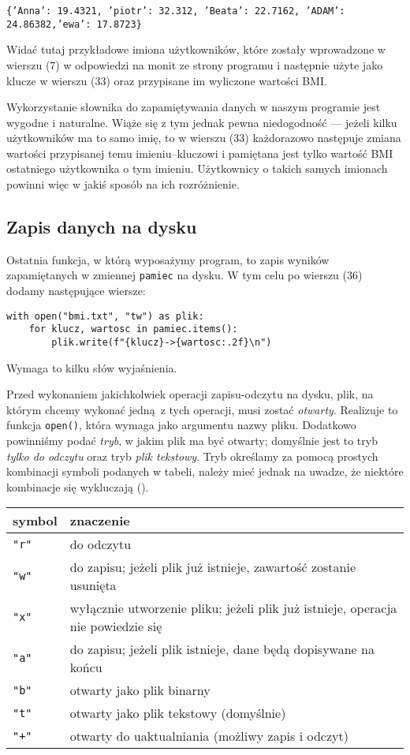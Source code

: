 \documentclass[a4paper]{article}
\begin{document}
\texttt{\{'Anna': 19.4321, 'piotr': 32.312, 'Beata': 22.7162, 'ADAM': 24.86382,\newline 'ewa': 17.8723\}}

Widać tutaj przykładowe imiona użytkowników, które zostały wprowadzone w wierszu (7) w odpowiedzi na monit ze strony programu i następnie użyte jako klucze w wierszu (33) oraz przypisane im wyliczone wartości BMI.

Wykorzystanie słownika do zapamiętywania danych w naszym programie jest wygodne i naturalne. Wiąże się z tym jednak pewna niedogodność --- jeżeli kilku użytkowników ma to samo imię, to w wierszu (33) każdorazowo następuje zmiana wartości przypisanej temu imieniu--kluczowi i pamiętana jest tylko wartość BMI ostatniego użytkownika o tym imieniu. Użytkownicy o takich samych imionach powinni więc w jakiś sposób na ich rozróżnienie.

\subsection{Zapis danych na dysku}

Ostatnia funkcja, w którą wyposażymy program, to zapis wyników zapamiętanych w zmiennej \texttt{pamiec} na dysku. W tym celu po wierszu (36) dodamy następujące wiersze:

\begin{lstlisting}[firstnumber=37]
with open("bmi.txt", "tw") as plik:
    for klucz, wartosc in pamiec.items():
        plik.write(f"{klucz}->{wartosc:.2f}\n")
\end{lstlisting}

Wymaga to kilku słów wyjaśnienia.

Przed wykonaniem jakichkolwiek operacji zapisu-odczytu na dysku, plik, na którym chcemy wykonać jedną z tych operacji, musi zostać \emph{otwarty}. Realizuje to funkcja \texttt{open()}, która wymaga jako argumentu nazwy pliku. Dodatkowo powinniśmy podać \emph{tryb}, w jakim plik ma być otwarty; domyślnie jest to tryb \emph{tylko do odczytu} oraz tryb \emph{plik tekstowy}. Tryb określamy za pomocą prostych kombinacji symboli podanych w tabeli, należy mieć jednak na uwadze, że niektóre kombinacje się wykluczają ().

\begin{tabular}{l | l}
\textsf{symbol} & \textsf{znaczenie} \\
\hline
\texttt{"r"} & do odczytu \\
\texttt{"w"} & do zapisu; jeżeli plik już istnieje, zawartość zostanie usunięta \\
\texttt{"x"} & wyłącznie utworzenie pliku; jeżeli plik już istnieje, operacja nie powiedzie się \\
\texttt{"a"} & do zapisu; jeżeli plik istnieje, dane będą dopisywane na końcu \\
\texttt{"b"} & otwarty jako plik binarny \\
\texttt{"t"} & otwarty jako plik tekstowy (domyślnie) \\
\texttt{"+"} & otwarty do uaktualniania (możliwy zapis i odczyt) \\
\end{tabular}
\end{document}
